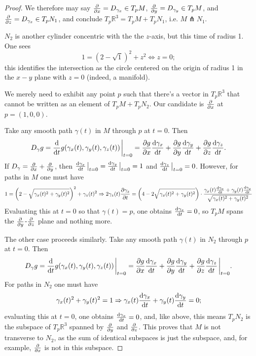 \documentclass{article}
\begin{document}
\begin{proof}
  We therefore may say $\pdv{x} = D_{\gamma_{x}} \in T_{p}M$, $\pdv{y} = D_{\gamma_{y}} \in T_{p}M$,
  and $\pdv{z} = D_{\gamma_{x}} \in T_{p}N_{1}$, and conclude $T_{p}\mathbb{R}^{3} = T_{p}M + T_{p}N_{1}$,
  i.e. $M \pitchfork N_{1}$.

  $N_{2}$ is another cylinder concentric with the the $z$-axis, but this time of radius 1.
  One sees
  \[
    1 = (2 - \sqrt{1})^{2} + z^{2} \Leftrightarrow z = 0;
  \]
  this identifies the intersection as the circle centered on the origin of radius 1 in the $x-y$ plane with $z = 0$
  (indeed, a manifold).

  We merely need to exhibit any point $p$ such that there's a vector in $T_{p}\mathbb{R}^{3}$ that cannot be written
  as an element of $T_{p}M + T_{p}N_{2}$.
  Our candidate is $\pdv{x}$ at $p = (1, 0, 0)$.

  Take any smooth path $\gamma(t)$ in $M$ through $p$ at $t = 0$.
  Then
  \[
    D_{\gamma}g = \dv{t}g(\gamma_{x}(t), \gamma_{y}(t), \gamma_{z}(t))\eval_{t = 0}
    = \pdv{g}{x}\dv{\gamma_{x}}{t} + \pdv{g}{y}\dv{\gamma_{y}}{t} + \pdv{g}{z}\dv{\gamma_{z}}{t}.
  \]
  If $D_{\gamma} = \pdv{x} + \pdv{y}$, then $\dv{\gamma_{x}}{t}\eval_{t = 0} = \dv{\gamma_{y}}{t}\eval_{t = 0} = 1$
  and $\dv{\gamma_{z}}{t}\eval_{t = 0} = 0$.
  However, for paths in $M$ one must have
  \[
    1 = \qty(2 - \sqrt{\gamma_{x}(t)^{2} + \gamma_{y}(t)^{2}})^{2} + \gamma_{z}(t)^{2}
    \Rightarrow 2\gamma_{z}(t)\pdv{\gamma_{z}}{t} = \qty(4 - 2\sqrt{\gamma_{x}(t)^{2} + \gamma_{y}(t)^{2}})
    \cdot \frac{\gamma_{x}(t)\dv{\gamma_{x}}{t} + \gamma_{y}(t)\dv{\gamma_{y}}{t}}{\sqrt{\gamma_{x}(t)^{2} + \gamma_{y}(t)^{2}}}
  \]
  Evaluating this at $t = 0$ so that $\gamma(t) = p$, one obtains $\dv{\gamma_{x}}{t} = 0$,
  so $T_{p}M$ spans the $\pdv{y}$-$\pdv{z}$ plane and nothing more.

  The other case proceeds similarly.
  Take any smooth path $\gamma(t)$ in $N_{2}$ through $p$ at $t = 0$.
  Then
  \[
    D_{\gamma}g = \dv{t}g(\gamma_{x}(t), \gamma_{y}(t), \gamma_{z}(t))\eval_{t = 0}
    = \pdv{g}{x}\dv{\gamma_{x}}{t} + \pdv{g}{y}\dv{\gamma_{y}}{t} + \pdv{g}{z}\dv{\gamma_{z}}{t} \eval_{t = 0}.
  \]
  For paths in $N_{2}$ one must have
  \[
    \gamma_{x}(t)^{2} + \gamma_{y}(t)^{2} = 1
    \Rightarrow \gamma_{x}(t)\dv{\gamma_{x}}{t} + \gamma_{y}(t)\dv{\gamma_{y}}{t} = 0;
  \]
  evaluating this at $t = 0$, one obtains $\dv{\gamma_{x}}{t} = 0$,
  and, like above, this means $T_{p}N_{2}$ is the subspace of $T_{p}\mathbb{R}^{3}$ spanned by $\pdv{y}$ and $\pdv{z}$.
  This proves that $M$ is not transverse to $N_{2}$, as the sum of identical subspaces is just the subspace,
  and, for example, $\pdv{x}$ is not in this subspace.


\end{proof}
\end{document}

